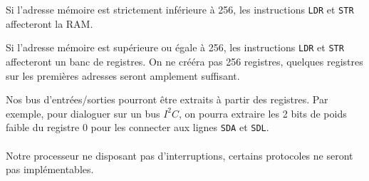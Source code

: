 \documentclass{article}
\begin{document}
    Si l'adresse mémoire est strictement inférieure à 256, les instructions \texttt{LDR} et \texttt{STR} affecteront la RAM.

    Si l'adresse mémoire est supérieure ou égale à 256, les instructions \texttt{LDR} et \texttt{STR} affecteront un banc de registres.
    On ne crééra pas 256 registres, quelques registres sur les premières adresses seront amplement suffisant.

    Nos bus d'entrées/sorties pourront être extraits à partir des registres.
    Par exemple, pour dialoguer sur un bus $I^2C$, on pourra extraire les 2 bits de poids faible du registre 0 pour les connecter aux lignes \texttt{SDA} et \texttt{SDL}.

    \paragraph{}
    Notre processeur ne disposant pas d'interruptions, certains protocoles ne seront pas implémentables.
\end{document}
